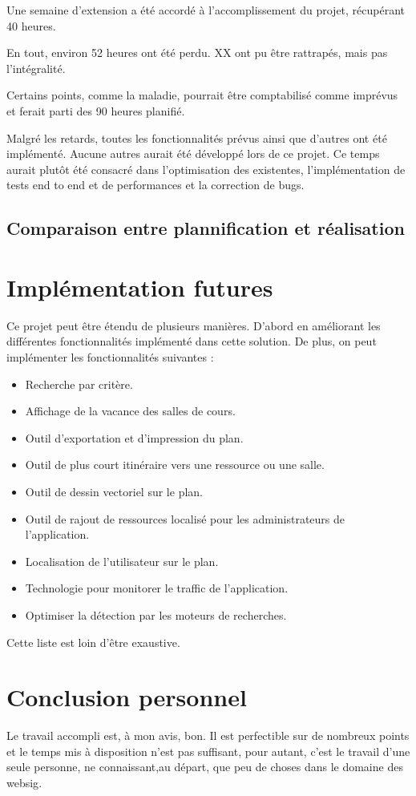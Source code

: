 \documentclass[
    iai, %
    il, %
]{heig-tb}
\begin{document}
Une semaine d'extension a été accordé à l'accomplissement du projet, récupérant 40 heures.

En tout, environ 52 heures ont été perdu. XX ont pu être rattrapés, mais pas l'intégralité.

Certains points, comme la maladie, pourrait être comptabilisé comme imprévus et ferait parti des 90 heures planifié.

Malgré les retards, toutes les fonctionnalités prévus ainsi que d'autres ont été implémenté.
Aucune autres aurait été développé lors de ce projet.
Ce temps aurait plutôt été consacré dans l'optimisation des existentes, l'implémentation de tests end to end et de performances et la correction de bugs.

\subsection{Comparaison entre plannification et réalisation}


\section{Implémentation futures}
Ce projet peut être étendu de plusieurs manières.
D'abord en améliorant les différentes fonctionnalités implémenté dans cette solution.
De plus, on peut implémenter les fonctionnalités suivantes :

\begin{itemize}
    \item Recherche par critère.
    \item Affichage de la vacance des salles de cours.
    \item Outil d'exportation et d'impression du plan.
    \item Outil de plus court itinéraire vers une ressource ou une salle.
    \item Outil de dessin vectoriel sur le plan.
    \item Outil de rajout de ressources localisé pour les administrateurs de l'application.
    \item Localisation de l'utilisateur sur le plan.
    \item Technologie pour monitorer le traffic de l'application.
    \item Optimiser la détection par les moteurs de recherches.
\end{itemize}

Cette liste est loin d'être exaustive.

\section{Conclusion personnel}
Le travail accompli est, à mon avis, bon. Il est perfectible sur de nombreux points
et le temps mis à disposition n'est pas suffisant,
pour autant, c'est le travail d'une seule personne, ne connaissant,au départ, que peu de choses dans le domaine des \gls{websig}.
\end{document}
